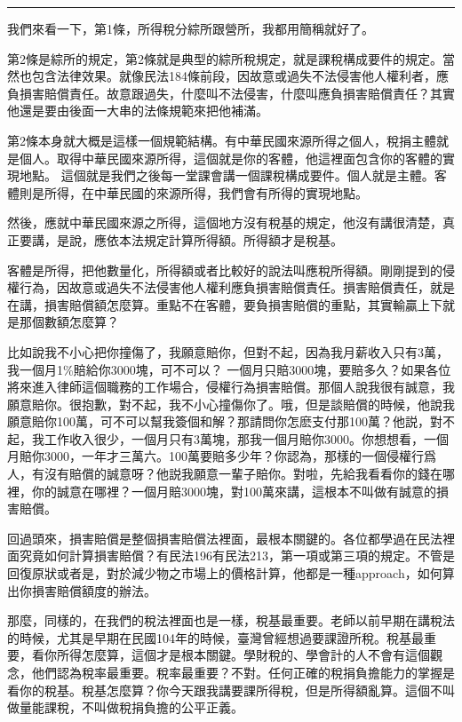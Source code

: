 \documentclass[oneside,sub3section]{ctexbook}
\begin{document}
\begin{center}\rule{0.5\linewidth}{0.5pt}\end{center}

我們來看一下，第1條，所得稅分綜所跟營所，我都用簡稱就好了。

第2條是綜所的規定，第2條就是典型的綜所稅規定，就是課稅構成要件的規定。當然也包含法律效果。就像民法184條前段，因故意或過失不法侵害他人權利者，應負損害賠償責任。故意跟過失，什麼叫不法侵害，什麼叫應負損害賠償責任？其實他還是要由後面一大串的法條規範來把他補滿。

第2條本身就大概是這樣一個規範結構。有中華民國來源所得之個人，稅捐主體就是個人。取得中華民國來源所得，這個就是你的客體，他這裡面包含你的客體的實現地點。
這個就是我們之後每一堂課會講一個課稅構成要件。個人就是主體。客體則是所得，在中華民國的來源所得，我們會有所得的實現地點。

然後，應就中華民國來源之所得，這個地方沒有稅基的規定，他沒有講很清楚，真正要講，是說，應依本法規定計算所得額。所得額才是稅基。

客體是所得，把他數量化，所得額或者比較好的說法叫應稅所得額。剛剛提到的侵權行為，因故意或過失不法侵害他人權利應負損害賠償責任。損害賠償責任，就是在講，損害賠償額怎麼算。重點不在客體，要負損害賠償的重點，其實輸贏上下就是那個數額怎麼算？

比如說我不小心把你撞傷了，我願意賠你，但對不起，因為我月薪收入只有3萬，我一個月1\%賠給你3000塊，可不可以？ 一個月只賠3000塊，要賠多久？如果各位將來進入律師這個職務的工作場合，侵權行為損害賠償。那個人說我很有誠意，我願意賠你。很抱歉，對不起，我不小心撞傷你了。哦，但是談賠償的時候，他說我願意賠你100萬，可不可以幫我簽個和解？那請問你怎麽支付那100萬？他説，對不起，我工作收入很少，一個月只有3萬塊，那我一個月賠你3000。你想想看，一個月賠你3000，一年才三萬六。100萬要賠多少年？你認為，那樣的一個侵權行爲人，有沒有賠償的誠意呀？他説我願意一輩子賠你。對啦，先給我看看你的錢在哪裡，你的誠意在哪裡？一個月賠3000塊，對100萬來講，這根本不叫做有誠意的損害賠償。

回過頭來，損害賠償是整個損害賠償法裡面，最根本關鍵的。各位都學過在民法裡面究竟如何計算損害賠償？有民法196有民法213，第一項或第三項的規定。不管是回復原狀或者是，對於減少物之市場上的價格計算，他都是一種approach，如何算出你損害賠償額度的辦法。

那麼，同樣的，在我們的稅法裡面也是一樣，稅基最重要。老師以前早期在講稅法的時候，尤其是早期在民國104年的時候，臺灣曾經想過要課證所稅。稅基最重要，看你所得怎麼算，這個才是根本關鍵。學財稅的、學會計的人不會有這個觀念，他們認為稅率最重要。稅率最重要？不對。任何正確的稅捐負擔能力的掌握是看你的稅基。稅基怎麼算？你今天跟我講要課所得稅，但是所得額亂算。這個不叫做量能課稅，不叫做稅捐負擔的公平正義。
\end{document}
